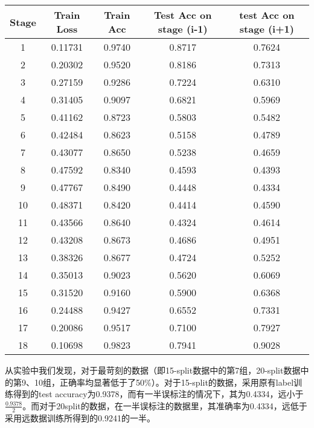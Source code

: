 \documentclass{article}
\begin{document}
\begin{center}
    \begin{tabular}{|c|c|c|c|c|}
        \hline
        Stage & Train Loss & Train Acc & Test Acc on stage (i-1) & test Acc on stage (i+1) \\
        \hline
        1 & 0.11731 & 0.9740 & 0.8717 & 0.7624 \\
        \hline
        2 & 0.20302 & 0.9520 & 0.8186 & 0.7313 \\
        \hline
        3 & 0.27159 & 0.9286 & 0.7224 & 0.6310 \\
        \hline
        4 & 0.31405 & 0.9097 & 0.6821 & 0.5969 \\
        \hline
        5 & 0.41162 & 0.8723 & 0.5803 & 0.5482 \\
        \hline
        6 & 0.42484 & 0.8623 & 0.5158 & 0.4789 \\
        \hline
        7 & 0.43077 & 0.8650 & 0.5238 & 0.4659 \\
        \hline
        8 & 0.47592 & 0.8340 & 0.4593 & 0.4393 \\
        \hline
        9 & 0.47767 & 0.8490 & 0.4448 & 0.4334 \\
        \hline
        10 & 0.48371 & 0.8420 & 0.4414 & 0.4590 \\
        \hline
        11 & 0.43566 & 0.8640 & 0.4324 & 0.4614 \\
        \hline
        12 & 0.43208 & 0.8673 & 0.4686 & 0.4951 \\
        \hline
        13 & 0.38326 & 0.8677 & 0.4724 & 0.5252 \\
        \hline
        14 & 0.35013 & 0.9023 & 0.5620 & 0.6069 \\
        \hline
        15 & 0.31520 & 0.9160 & 0.5900 & 0.6368 \\
        \hline
        16 & 0.24488 & 0.9427 & 0.6552 & 0.7331 \\
        \hline
        17 & 0.20086 & 0.9517 & 0.7100 & 0.7927 \\
        \hline
        18 & 0.10698 & 0.9823 & 0.7941 & 0.9028 \\
        \hline
    \end{tabular}
\end{center}

从实验中我们发现，对于最苛刻的数据（即15-split数据中的第7组，20-split数据中的第9、10组，正确率均显著低于了50\%）。对于15-split的数据，采用原有label训练得到的test accuracy为0.9378，而有一半误标注的情况下，其为0.4334，远小于$\frac{0.9378}{2}$。而对于20split的数据，在一半误标注的数据里，其准确率为0.4334，远低于采用远数据训练所得到的0.9241的一半。
\end{document}
